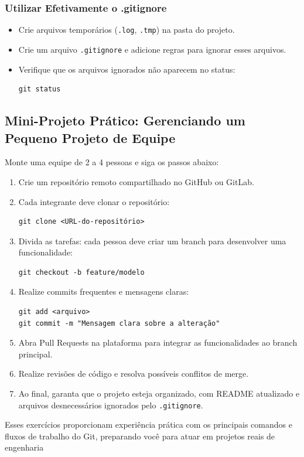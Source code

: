 \subsubsection{Utilizar Efetivamente o .gitignore}
\begin{itemize}
    \item Crie arquivos temporários (\texttt{.log}, \texttt{.tmp}) na pasta do projeto.
    \item Crie um arquivo \texttt{.gitignore} e adicione regras para ignorar esses arquivos.
    \item Verifique que os arquivos ignorados não aparecem no status:
    \begin{lstlisting}[style=shellstyle]
git status
    \end{lstlisting}
\end{itemize}

\subsection{Mini-Projeto Prático: Gerenciando um Pequeno Projeto de Equipe}

Monte uma equipe de 2 a 4 pessoas e siga os passos abaixo:

\begin{enumerate}
    \item Crie um repositório remoto compartilhado no GitHub ou GitLab.
    \item Cada integrante deve clonar o repositório:
    \begin{lstlisting}[style=shellstyle]
git clone <URL-do-repositório>
    \end{lstlisting}
    \item Divida as tarefas: cada pessoa deve criar um branch para desenvolver uma funcionalidade:
    \begin{lstlisting}[style=shellstyle]
git checkout -b feature/modelo
    \end{lstlisting}
    \item Realize commits frequentes e mensagens claras:
    \begin{lstlisting}[style=shellstyle]
git add <arquivo>
git commit -m "Mensagem clara sobre a alteração"
    \end{lstlisting}
    \item Abra Pull Requests na plataforma para integrar as funcionalidades ao branch principal.
    \item Realize revisões de código e resolva possíveis conflitos de merge.
    \item Ao final, garanta que o projeto esteja organizado, com README atualizado e arquivos desnecessários ignorados pelo \texttt{.gitignore}.
\end{enumerate}

Esses exercícios proporcionam experiência prática com os principais comandos e fluxos de trabalho do Git, preparando você para atuar em projetos reais de engenharia

